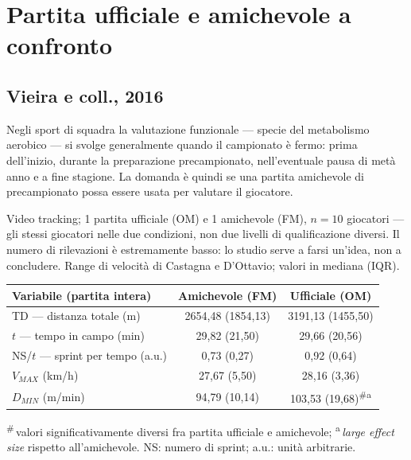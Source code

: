 \section{Partita ufficiale e amichevole a confronto}

\subsection{Vieira e coll., 2016}

Negli sport di squadra la valutazione funzionale --- specie del metabolismo aerobico --- si svolge
generalmente quando il campionato è fermo: prima dell'inizio, durante la preparazione precampionato,
nell'eventuale pausa di metà anno e a fine stagione. La domanda è quindi se una partita amichevole
di precampionato possa essere usata per valutare il giocatore.

Video tracking; 1 partita ufficiale (OM) e 1 amichevole (FM), $n = 10$ giocatori --- gli stessi
giocatori nelle due condizioni, non due livelli di qualificazione diversi. Il numero di rilevazioni
è estremamente basso: lo studio serve a farsi un'idea, non a concludere. Range di velocità di
Castagna e D'Ottavio; valori in mediana (IQR).


\begin{center}
\footnotesize
\begin{tabular}{|l|c|c|}
\hline
\textbf{Variabile (partita intera)} & \textbf{Amichevole (FM)} & \textbf{Ufficiale (OM)} \\
\hline
TD --- distanza totale (m)          & 2654,48 (1854,13) & 3191,13 (1455,50) \\
$t$ --- tempo in campo (min)        & 29,82 (21,50)     & 29,66 (20,56) \\
NS/$t$ --- sprint per tempo (a.u.)  & 0,73 (0,27)       & 0,92 (0,64) \\
$V_{MAX}$ (km/h)                    & 27,67 (5,50)      & 28,16 (3,36) \\
$D_{MIN}$ (m/min)                   & 94,79 (10,14)     & 103,53 (19,68)\textsuperscript{\#a} \\
\hline
\end{tabular}
\end{center}
\footnotesize \textsuperscript{\#}\,valori significativamente diversi fra partita ufficiale e
amichevole; \textsuperscript{a}\,\textit{large effect size} rispetto all'amichevole. NS: numero di
sprint; a.u.: unità arbitrarie.
\normalsize

